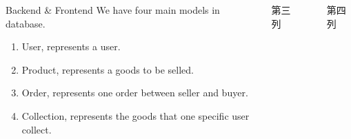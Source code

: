 \documentclass[final]{beamer}
\newlength{\sepwid}
\newlength{\onecolwid}
\newlength{\twocolwid}
\begin{document}
\begin{frame}[t]
\begin{columns}[t]
\begin{column}{\onecolwid}
\begin{block}{Backend \& Frontend}
        We have four main models in database.
        \begin{enumerate}
        \item User, represents a user.
        \item Product, represents a goods to be selled.
        \item Order, represents one order between seller and buyer.
        \item Collection, represents the goods that one specific user collect.
        \end{enumerate}
        \end{block}




    \end{column} %

    \begin{column}{\onecolwid}\vspace{-.6in} %
    第三列



    \end{column} %
    \begin{column}{\sepwid}\end{column} %
        
    \begin{column}{\onecolwid}
    第四列
    \end{column}
\end{columns} %







\end{frame}
\end{document}
